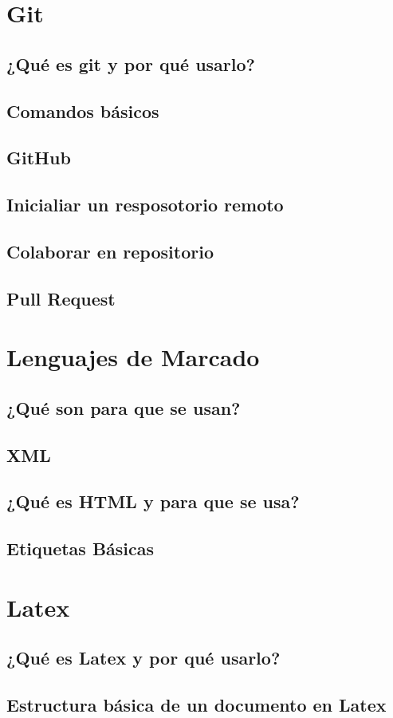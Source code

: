 \documentclass[11pt,letterpaper]{article}
\begin{document}
\section{Git}
\subsection{¿Qué es git y por qué usarlo?}
\subsection{Comandos básicos}
\subsection{GitHub}
\subsection{Inicialiar un resposotorio remoto}
\subsection{Colaborar en repositorio}
\subsection{Pull Request}
\section{Lenguajes de Marcado}
\subsection{¿Qué son para que se usan?}
\subsection{XML}
\subsection{¿Qué es HTML y para que se usa?}
\subsection{Etiquetas Básicas}
\section{Latex}
\subsection{¿Qué es Latex y por qué usarlo?}
\subsection{Estructura básica de un documento en Latex}
\end{document}
